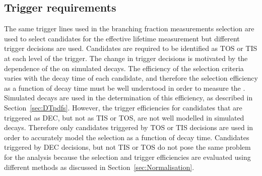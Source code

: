 \subsection{Trigger requirements}
\label{sec:ELtrigger}
The same trigger lines used in the branching fraction measurements selection are used to select candidates for the effective lifetime measurement but different trigger decisions are used. 
Candidates are required to be identified as TOS or TIS at each level of the trigger. The change in trigger decisions is motivated by the dependence of the \elm on simulated decays. The efficiency of the selection criteria varies with the decay time of each candidate, and therefore the selection efficiency as a function of decay time must be well understood in order to measure the \el. Simulated decays are used in the determination of this efficiency, as described in Section~\ref{sec:DTpdfs}. However, the trigger efficiencies for candidates that are triggered as DEC, but not as TIS or TOS, are not well modelled in simulated decays. Therefore only candidates triggered by TOS or TIS decisions are used in order to accurately model the selection as a function of decay time. %
Candidates triggered by DEC decisions, but not TIS or TOS do not pose the same problem for the \BF analysis because the selection and trigger efficiencies are evaluated using different methods as discussed in Section~\ref{sec:Normalisation}.

